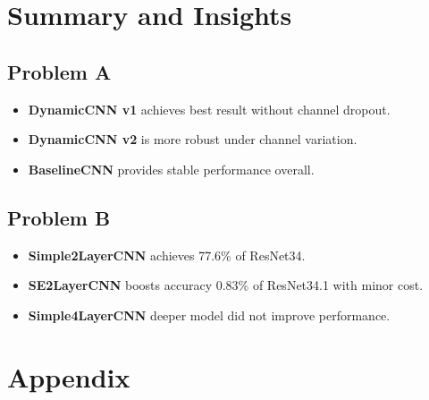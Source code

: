 \documentclass[12pt]{article}
\begin{document}
\section*{Summary and Insights}

\subsection*{Problem A}
\begin{itemize}[noitemsep]
    \item \textbf{DynamicCNN v1} achieves best result without channel dropout.
    \item \textbf{DynamicCNN v2} is more robust under channel variation.
    \item \textbf{BaselineCNN} provides stable performance overall.
\end{itemize}

\subsection*{Problem B}
\begin{itemize}[noitemsep]
    \item \textbf{Simple2LayerCNN} achieves 77.6\% of ResNet34.
    \item \textbf{SE2LayerCNN} boosts accuracy 0.83\% of ResNet34.1 with minor cost.
    \item \textbf{Simple4LayerCNN} deeper model did not improve performance.
\end{itemize}

\section*{Appendix}
\end{document}
